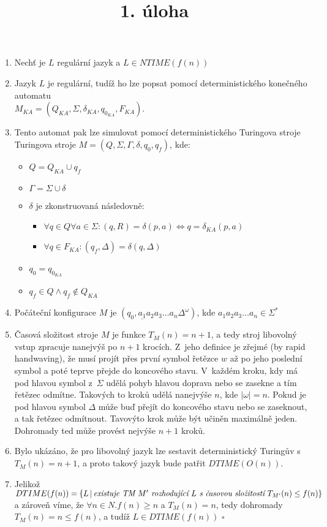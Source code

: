 \documentclass[a4paper]{article}
\title {1. úloha}
\begin{document}
\section*{}
\begin{enumerate}
    \item Nechť je $L$ regulární jazyk a $L \in NTIME(f(n))$
    \item Jazyk $L$ je regulární, tudíž ho lze popsat pomocí deterministického konečného automatu\\ $M_{KA}=(Q_{KA},\Sigma, \delta_{KA}, q_{0_{KA}}, F_{KA})$.
    \item Tento automat pak lze simulovat pomocí deterministického Turingova stroje Turingova stroje $M=(Q, \Sigma, \Gamma, \delta, q_0, q_f)$, kde:
    \begin{itemize}
        \item $Q=Q_{KA}\cup {q_f}$
        \item $\Gamma = \Sigma \cup {\delta}$
        \item $\delta$ je zkonstruovaná následovně:
        \begin{itemize}
            \item $\forall q \in Q \forall a \in \Sigma: (q,R) = \delta(p,a) \Leftrightarrow q=\delta_{KA}(p,a)$
            \item $\forall q \in F_{KA}: (q_f,\Delta) = \delta(q,\Delta)$
        \end{itemize}
        \item $q_0 = q_{0_{KA}}$
        \item $q_f \in Q \wedge q_f \notin Q_{KA}$
    \end{itemize}
    \item Počáteční konfigurace $M$ je $(q_0,\underline{a_1} a_2 a_3\ldots a_n\Delta^{\omega})$, kde $a_1a_2a_3\ldots a_n \in \Sigma^*$
    \item Časová složitost stroje $M$ je funkce $T_M(n)=n+1$, a tedy stroj libovolný vstup zpracuje nanejvýš po $n+1$ krocích.
    Z~jeho definice je zřejmé (by rapid handwaving), že musí projít přes první symbol řetězce $w$ až po jeho poslední symbol a poté teprve
    přejde do koncového stavu.
    V~každém kroku, kdy má pod hlavou symbol z~$\Sigma$ udělá pohyb hlavou doprava nebo se zasekne a tím řetězec odmítne.
    Takových to kroků udělá nanejvýše $n$, kde $|\omega| = n$.
    Pokud je pod hlavou symbol $\Delta$ může buď přejít do koncového stavu nebo se zaseknout, a tak řetězec odmítnout.
    Tavovýto krok může být učiněn maximálně jeden.
    Dohromady ted může provést nejvýše $n+1$ kroků.
    \item Bylo ukázáno, že pro libovolný jazyk lze sestavit deterministický Turingův s~$T_M(n)=n+1$, a proto takový jazyk
    bude patřit $DTIME(O(n))$.
    \item Jelikož $DTIME(f(n)) = \{L\,|\, \emph{existuje TM }M' \emph{ rozhodující }L\emph{ s~časovou složitostí } T_{M'}(n) \leq f(n)\}$ a zároveň
    víme, že $\forall n \in N.f(n) \geq n$ a $T_M(n)=n$, tedy dohromady $T_M(n)=n \leq f(n)$, a tudíž $L\in DTIME(f(n))$ $\square$
\end{enumerate}
\end{document}
